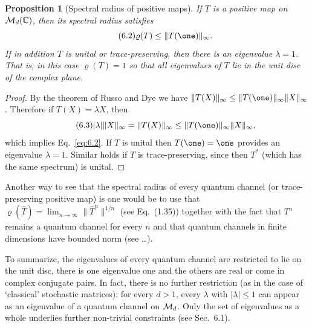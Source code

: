 \documentclass[11pt,a4paper]{article}
\theoremstyle{plain}
\newtheorem{proposition}{Proposition}[section]
\theoremstyle{definition}
\theoremstyle{remark}
\begin{document}
\begin{proposition}[Spectral radius of positive maps]
    If $T$ is a positive map on $\mathcal{M}_d(\mathbb{C})$, then its spectral radius satisfies
    \begin{equation}\tag{6.2}\label{eq:6.2}
        \varrho(T)\le \|T(\one)\|_\infty.
    \end{equation}
    If in addition $T$ is unital or trace-preserving, then there is an eigenvalue
    $\lambda=1$. That is, in this case $\varrho(T)=1$ so that all eigenvalues of $T$
    lie in the unit disc of the complex plane.
\end{proposition}

\begin{proof}
    By the theorem of Russo and Dye we have $\|T(X)\|_\infty \le \|T(\one)\|_\infty\|X\|_\infty$.
    Therefore if $T(X)=\lambda X$, then
    \begin{equation}\tag{6.3}\label{eq:6.3}
        |\lambda|\|X\|_\infty = \|T(X)\|_\infty \le \|T(\one)\|_\infty\|X\|_\infty,
    \end{equation}
    which implies Eq.~\eqref{eq:6.2}. If $T$ is unital then $T(\one)=\one$ provides
    an eigenvalue $\lambda=1$. Similar holds if $T$ is trace-preserving, since then
    $T^*$ (which has the same spectrum) is unital.
\end{proof}

Another way to see that the spectral radius of every quantum channel (or
trace-preserving positive map) is one would be to use that
$\varrho(\widehat{T})=\lim_{n\to\infty}\|\widehat{T}^n\|^{1/n}$ (see Eq.~(1.35))
together with the fact that $T^n$ remains a quantum channel for every $n$ and
that quantum channels in finite dimensions have bounded norm (see \dots).

To summarize, the eigenvalues of every quantum channel are restricted to lie on
the unit disc, there is one eigenvalue one and the others are real or come in
complex conjugate pairs. In fact, there is no further restriction (as in the
case of `classical' stochastic matrices): for every $d>1$, every $\lambda$ with
$|\lambda|\le 1$ can appear as an eigenvalue of a quantum channel on $\mathcal{M}_d$.
Only the set of eigenvalues as a whole underlies further non-trivial constraints
(see Sec.~6.1).
\end{document}
